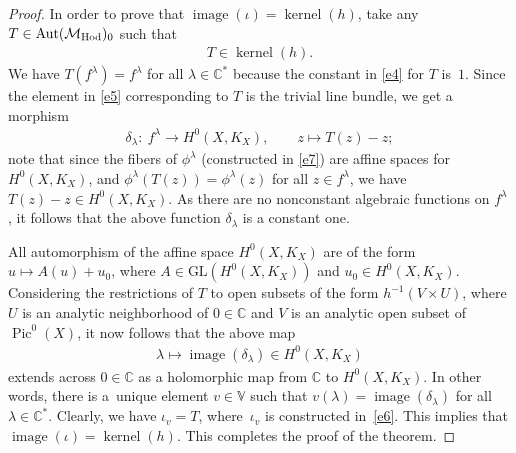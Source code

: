 \begin{proof}
In order to prove that $\operatorname{image}(\iota) = \operatorname{kernel}(h)$, take any $T \in \operatorname{Aut}({\mathcal M}_{\rm Hod})_0$ such that
\begin{gather*}T \in \operatorname{kernel}(h) .\end{gather*} We have $T(f^\lambda) = f^\lambda$ for all
$\lambda \in {\mathbb C}^*$ because the constant in \eqref{e4} for $T$ is~$1$. Since the element in \eqref{e5} corresponding to $T$ is the trivial line bundle, we get a morphism
\begin{gather*}
\delta_\lambda \colon \  f^\lambda \longrightarrow H^0(X, K_X) ,\qquad z \longmapsto T(z) - z ;
\end{gather*}
note that since the f\/ibers of $\phi^\lambda$ (constructed in \eqref{e7}) are af\/f\/ine spaces for $H^0(X, K_X)$, and $\phi^\lambda(T(z)) = \phi^\lambda(z)$ for all $z \in f^\lambda$, we have $T(z) - z \in H^0(X, K_X)$. As there are no nonconstant algebraic functions on $f^\lambda$ \cite[Proposition~2.2]{BBS}, it follows that the above function $\delta_\lambda$ is a constant one.

All automorphism of the af\/f\/ine space $H^0(X, K_X)$ are of the form $u \longmapsto A(u)+u_0$, where $A \in \text{GL}(H^0(X, K_X))$ and $u_0 \in H^0(X, K_X)$. Considering the restrictions of $T$ to open subsets of the form $h^{-1}(V\times U)$, where $U$ is an analytic neighborhood of $0 \in \mathbb C$ and $V$ is an analytic open subset of $\operatorname{Pic}^0(X)$, it now follows that the above map
\begin{gather*}\lambda \longmapsto \operatorname{image}(\delta_\lambda) \in H^0(X, K_X)\end{gather*}
extends across $0 \in \mathbb C$ as a holomorphic map from $\mathbb C$ to $H^0(X, K_X)$. In other words, there is a~unique element $v \in {\mathbb V}$ such that $v(\lambda) = \operatorname{image} (\delta_\lambda)$ for all $\lambda \in {\mathbb C}^*$. Clearly, we have $\iota_v = T$, where~$\iota_v$ is constructed in~\eqref{e6}. This implies that $\operatorname{image}(\iota) = \operatorname{kernel}(h)$. This completes the proof of the theorem.
\end{proof}
